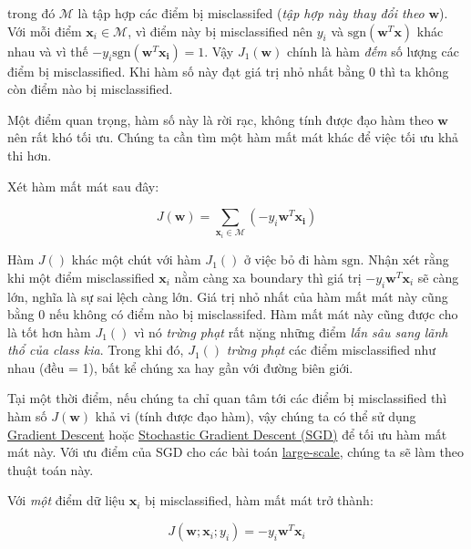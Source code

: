 trong đó $\mathcal{M}$ là tập hợp các điểm bị misclassifed (\textit{tập hợp này thay đổi theo} $\mathbf{w}$). Với mỗi điểm $\mathbf{x}_i \in \mathcal{M}$, vì điểm này bị misclassified nên $y_i$ và $\text{sgn}(\mathbf{w}^T\mathbf{x})$ khác nhau và vì thế $-y_i\text{sgn}(\mathbf{w}^T\mathbf{x_i}) = 1 $. Vậy $J_1(\mathbf{w})$ chính là hàm \textit{đếm} số lượng các điểm bị misclassified. Khi hàm số này đạt giá trị nhỏ nhất bằng 0 thì ta không còn điểm nào bị misclassified.  
 
Một điểm quan trọng, hàm số này là rời rạc, không tính được đạo hàm theo $\mathbf{w}$ nên rất khó tối ưu. Chúng ta cần tìm một hàm mất mát khác để việc tối ưu khả thi hơn. 
 
Xét hàm mất mát sau đây:  
 
\begin{equation} 
    J(\mathbf{w}) = \sum_{\mathbf{x}_i \in \mathcal{M}} (-y_i\mathbf{w}^T\mathbf{x_i}) 
\end{equation} 
 
Hàm $J()$ khác một chút với hàm $J_1()$ ở việc bỏ đi hàm $\text{sgn}$. Nhận xét rằng khi một điểm misclassified $\mathbf{x}_i$ nằm càng xa boundary thì giá trị $-y_i\mathbf{w}^T\mathbf{x}_i$ sẽ càng lớn, nghĩa là sự sai lệch càng lớn. Giá trị nhỏ nhất của hàm mất mát này cũng bằng 0 nếu không có điểm nào bị misclassifed. Hàm mất mát này cũng được cho là tốt hơn hàm $J_1()$ vì nó \textit{trừng phạt} rất nặng những điểm \textit{lấn sâu sang lãnh thổ của class kia}. Trong khi đó, $J_1()$ \textit{trừng phạt} các điểm misclassified như nhau (đều = 1), bất kể chúng xa hay gần với đường biên giới. 
 
Tại một thời điểm, nếu chúng ta chỉ quan tâm tới các điểm bị misclassified thì hàm số $J(\mathbf{w})$ khả vi (tính được đạo hàm), vậy chúng ta có thể sử dụng \href{http://machinelearningcoban.com/2017/01/12/gradientdescent/}{Gradient Descent} hoặc \href{http://machinelearningcoban.com/2017/01/16/gradientdescent2/#-stochastic-gradient-descent}{Stochastic Gradient Descent (SGD)} để tối ưu hàm mất mát này. Với ưu điểm của SGD cho các bài toán \href{http://machinelearningcoban.com/2017/01/12/gradientdescent/#large-scale}{large-scale}, chúng ta sẽ làm theo thuật toán này.  
 
Với \textit{một} điểm dữ liệu $\mathbf{x}_i$ bị misclassified, hàm mất mát trở thành: 
 
\begin{equation} 
    J(\mathbf{w}; \mathbf{x}_i; y_i) = -y_i\mathbf{w}^T\mathbf{x}_i 
\end{equation} 
 
